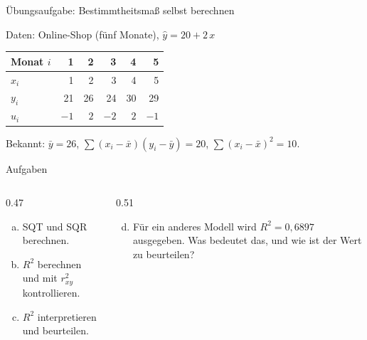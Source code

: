 \documentclass[aspectratio=169,11pt]{beamer}
\begin{document}
\begin{frame}{Übungsaufgabe: Bestimmtheitsmaß selbst berechnen}
  \begin{block}{Daten: Online-Shop (fünf Monate), $\hat{y} = 20 + 2\,x$}
    \begin{center}
      \renewcommand{\arraystretch}{1.05}
      \begin{tabular}{l*{5}{r}}
        \toprule
        Monat $i$ & 1  & 2  & 3  & 4  & 5  \\
        \midrule
        $x_i$     & 1  & 2  & 3  & 4  & 5  \\
        $y_i$     & 21 & 26 & 24 & 30 & 29 \\
        $\hat{u}_i$ & $-1$ & $2$ & $-2$ & $2$ & $-1$ \\
        \bottomrule
      \end{tabular}
    \end{center}
    \footnotesize Bekannt: $\bar{y} = 26$, $\sum (x_i-\bar{x})(y_i-\bar{y}) = 20$,
    $\sum (x_i-\bar{x})^{2} = 10$.
  \end{block}

  \begin{exampleblock}{Aufgaben}
    \begin{columns}[T]
      \begin{column}{0.47\textwidth}
        \begin{enumerate}[a)]
          \item SQT und SQR berechnen.
          \item $R^{2}$ berechnen und mit $r_{xy}^{2}$ kontrollieren.
          \item $R^{2}$ interpretieren und beurteilen.
        \end{enumerate}
      \end{column}
      \begin{column}{0.51\textwidth}
        \begin{enumerate}[a)]
          \setcounter{enumi}{3}
          \item Für ein anderes Modell wird $R^{2} = 0{,}6897$ ausgegeben.
                Was bedeutet das, und wie ist der Wert zu beurteilen?
        \end{enumerate}
      \end{column}
    \end{columns}
  \end{exampleblock}
\end{frame}
\end{document}
